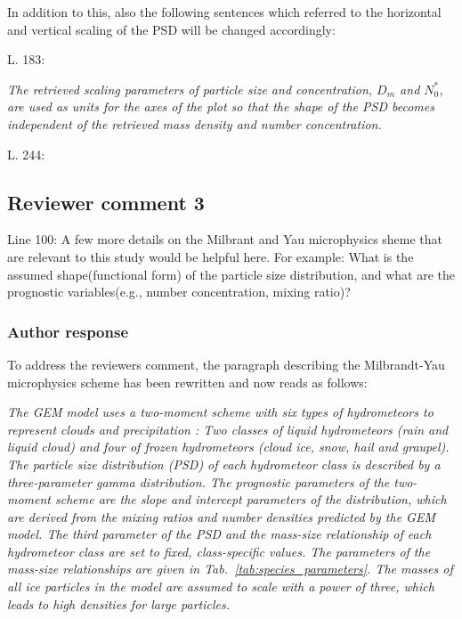 \documentclass[11pt]{scrartcl}
\begin{document}
In addition to this, also the following sentences which referred to the horizontal and vertical
scaling of the PSD will be changed accordingly:

L. 183:

\textit{ The retrieved scaling parameters of particle size and concentration,
  $D_m$ and $N_0^*$, are used as units for the axes of the plot so that the
  shape of the PSD becomes independent of the retrieved mass density and number
  concentration. }

L. 244:


\subsection*{Reviewer comment 3}

Line 100: A few more details on the Milbrant and Yau microphysics sheme that are relevant to this study would be helpful here. For example: What is the assumed shape(functional form) of the particle size distribution, and what are the prognostic variables(e.g., number concentration, mixing ratio)?

\subsubsection*{Author response}

To address the reviewers comment, the paragraph describing the Milbrandt-Yau microphysics scheme
has been rewritten and now reads as follows:

\textit{
The GEM model uses a two-moment scheme with six types of hydrometeors to
represent clouds and precipitation \citep{milbrandtyau05}: Two classes of liquid
hydrometeors (rain and liquid cloud) and four of frozen hydrometeors (cloud ice,
snow, hail and graupel). The particle size distribution (PSD) of each
hydrometeor class is described by a three-parameter gamma distribution. The
prognostic parameters of the two-moment scheme are the slope and intercept
parameters of the distribution, which are derived from the mixing ratios and
number densities predicted by the GEM model. The third parameter of the PSD and
the mass-size relationship of each hydrometeor class are set to fixed,
class-specific values. The parameters of the mass-size relationships are given
in Tab.~\ref{tab:species_parameters}. The masses of all ice particles in the
model are assumed to scale with a power of three, which leads to high densities
for large particles.
  }
\end{document}
